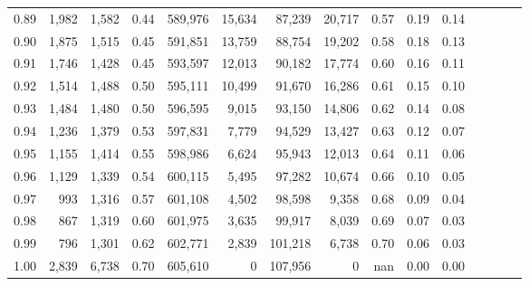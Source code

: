 \begin{tabular}{rrrcrrrrrrrrrrr}
0.89 &   1,982 &  1,582 &                                       0.44 &  589,976 &   15,634 &   87,239 &   20,717 &  0.57 &  0.19 &                         0.14 \\
0.90 &   1,875 &  1,515 &                                       0.45 &  591,851 &   13,759 &   88,754 &   19,202 &  0.58 &  0.18 &                         0.13 \\
0.91 &   1,746 &  1,428 &                                       0.45 &  593,597 &   12,013 &   90,182 &   17,774 &  0.60 &  0.16 &                         0.11 \\
0.92 &   1,514 &  1,488 &                                       0.50 &  595,111 &   10,499 &   91,670 &   16,286 &  0.61 &  0.15 &                         0.10 \\
0.93 &   1,484 &  1,480 &                                       0.50 &  596,595 &    9,015 &   93,150 &   14,806 &  0.62 &  0.14 &                         0.08 \\
0.94 &   1,236 &  1,379 &                                       0.53 &  597,831 &    7,779 &   94,529 &   13,427 &  0.63 &  0.12 &                         0.07 \\
0.95 &   1,155 &  1,414 &                                       0.55 &  598,986 &    6,624 &   95,943 &   12,013 &  0.64 &  0.11 &                         0.06 \\
0.96 &   1,129 &  1,339 &                                       0.54 &  600,115 &    5,495 &   97,282 &   10,674 &  0.66 &  0.10 &                         0.05 \\
0.97 &     993 &  1,316 &                                       0.57 &  601,108 &    4,502 &   98,598 &    9,358 &  0.68 &  0.09 &                         0.04 \\
0.98 &     867 &  1,319 &                                       0.60 &  601,975 &    3,635 &   99,917 &    8,039 &  0.69 &  0.07 &                         0.03 \\
0.99 &     796 &  1,301 &                                       0.62 &  602,771 &    2,839 &  101,218 &    6,738 &  0.70 &  0.06 &                         0.03 \\
1.00 &   2,839 &  6,738 &                                       0.70 &  605,610 &        0 &  107,956 &        0 &   nan &  0.00 &                         0.00 \\
\bottomrule
\end{tabular}
